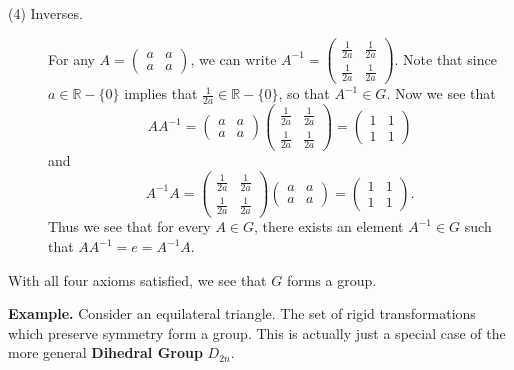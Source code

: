 \documentclass[12pt,letterpaper]{algebra_book}
\theoremstyle{definition}
\begin{document}
\begin{description}
        \item[(4) Inverses.] For any $A = 
        \begin{pmatrix}
            a & a\\
            a & a
        \end{pmatrix}$, we can write $A^{-1} = 
        \begin{pmatrix}
            \frac{1}{2a} & \frac{1}{2a}\\
            \frac{1}{2a} & \frac{1}{2a}
        \end{pmatrix}$. Note that since $a \in \mathbb{R} -\{0\}$
        implies that $\frac{1}{2a} \in \mathbb{R} - \{0\}$, so that
        $A^{-1} \in G$. Now we see that 
        \[
            AA^{-1} 
            = 
            \begin{pmatrix}
                a & a\\
                a & a
            \end{pmatrix}
            \begin{pmatrix}
                \frac{1}{2a} & \frac{1}{2a}\\
                \frac{1}{2a} & \frac{1}{2a}
            \end{pmatrix}
            = 
            \begin{pmatrix}
                1& 1\\
                1 & 1
            \end{pmatrix}
        \]
        and 
        \[
            A^{-1}A =
            \begin{pmatrix}
                \frac{1}{2a} & \frac{1}{2a}\\
                \frac{1}{2a} & \frac{1}{2a}
            \end{pmatrix}  
            \begin{pmatrix}
                a & a\\
                a & a
            \end{pmatrix}
            = 
            \begin{pmatrix}
                1& 1\\
                1 & 1
            \end{pmatrix}.
        \]
        Thus we see that for every $A \in G$, there exists an element
        $A^{-1} \in G$ such that $AA^{-1} = e = A^{-1}A$.
    \end{description}
    With all four axioms satisfied, we see that $G$ forms a group.

    \textbf{Example.} Consider an equilateral triangle. The set of rigid transformations
    which preserve symmetry form a group. This is actually just a
    special case of the more general \textbf{Dihedral Group} $D_{2n}$.
\end{document}
